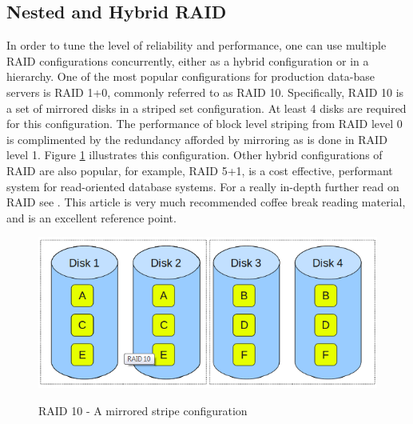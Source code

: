 \documentclass[10pt,a4paper]{article}
\begin{document}
\subsection{Nested and Hybrid RAID}
In order to tune the level of reliability and performance, one can use multiple RAID configurations concurrently, either as a hybrid configuration or in a hierarchy. One of the most popular configurations for production data-base servers is RAID 1+0, commonly referred to as RAID 10. Specifically, RAID 10 is a set of mirrored disks in a striped set configuration. At least 4 disks are required for this configuration. The performance of block level striping from RAID level 0 is complimented by the redundancy afforded by mirroring as is done in RAID level 1. Figure \ref{raid10} illustrates this configuration. Other hybrid configurations of RAID are also popular, for example, RAID 5+1, is a cost effective, performant system for read-oriented database systems. For a really in-depth further read on RAID see \cite{Patterson}. This article is very much recommended coffee break reading material, and is an excellent reference point. 
\begin{figure}
\caption{RAID 10 - A mirrored stripe configuration \cite{GEEKSRAID}}
\begin{center}
\includegraphics[scale=0.45]{../images/raid10.png}
\label{raid10}
\end{center}
\end{figure}
\end{document}
